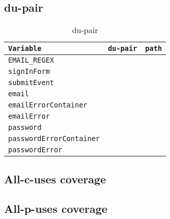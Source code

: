 \documentclass{article}
\begin{document}
\subsection*{du-pair}

\begin{table}[htp]
    \centering
    \begin{tabular}{l|c|c}
        \texttt{Variable}               & \texttt{du-pair} & \texttt{path} \\
        \toprule
        \bottomrule
        \texttt{EMAIL\_REGEX}           &                  &               \\
        \hline
        \texttt{signInForm}             &                  &               \\
        \hline
        \texttt{submitEvent}            &                  &               \\
        \hline
        \texttt{email}                  &                  &               \\
        \hline
        \texttt{emailErrorContainer}    &                  &               \\
        \hline
        \texttt{emailError}             &                  &               \\
        \hline
        \texttt{password}               &                  &               \\
        \hline
        \texttt{passwordErrorContainer} &                  &               \\
        \hline
        \texttt{passwordError}          &                  &               \\
    \end{tabular}
    \caption{du-pair}
\end{table}

\subsection{All-c-uses coverage}

\subsection{All-p-uses coverage}
\end{document}
